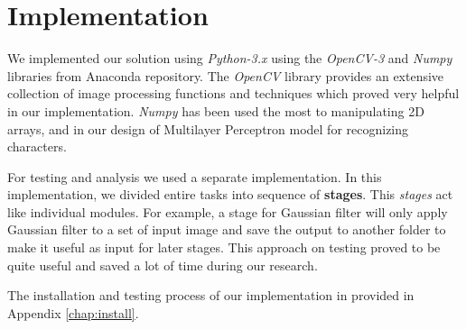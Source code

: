 \documentclass{standalone}
\begin{document}
\section{Implementation}
We implemented our solution using {\it Python-3.x} using the {\it OpenCV-3} and {\it Numpy} libraries from Anaconda repository. 
The {\it OpenCV} library provides an extensive collection of image processing functions and techniques which proved very helpful in our implementation. 
{\it Numpy} has been used the most to manipulating 2D arrays, and in our design of Multilayer Perceptron model for recognizing characters.

For testing and analysis we used a separate implementation. In this implementation, we divided entire tasks into sequence of {\bf stages}. This {\it stages} act like individual modules. For example, a stage for Gaussian filter will only apply Gaussian filter to a set of input image and save the output to another folder to make it useful as input for later stages. This approach on testing proved to be quite useful and saved a lot of time during our research.

The installation and testing process of our implementation in provided in Appendix \ref{chap:install}.
\end{document}
